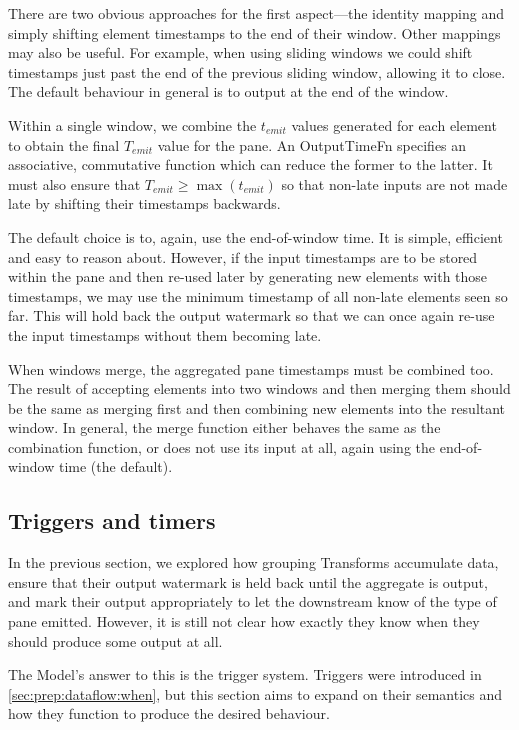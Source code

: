 There are two obvious approaches for the first aspect---the identity mapping and simply shifting element timestamps to the end of their window.
Other mappings may also be useful.
For example, when using sliding windows we could shift timestamps just past the end of the previous sliding window, allowing it to close.
The default behaviour in general is to output at the end of the window.

Within a single window, we combine the $t_{\mathit{emit}}$ values generated for each element to obtain the final $T_{\mathit{emit}}$ value for the pane.
An OutputTimeFn specifies an associative, commutative function which can reduce the former to the latter.
It must also ensure that $T_{\mathit{emit}} \geq \max(t_{\mathit{emit}})$ so that non-late inputs are not made late by shifting their timestamps backwards.

The default choice is to, again, use the end-of-window time.
It is simple, efficient and easy to reason about.
However, if the input timestamps are to be stored within the pane and then re-used later by generating new elements with those timestamps, we may use the minimum timestamp of all non-late elements seen so far.
This will hold back the output watermark so that we can once again re-use the input timestamps without them becoming late.

When windows merge, the aggregated pane timestamps must be combined too.
The result of accepting elements into two windows and then merging them should be the same as merging first and then combining new elements into the resultant window.
In general, the merge function either behaves the same as the combination function, or does not use its input at all, again using the end-of-window time (the default).

\subsection{Triggers and timers}

In the previous section, we explored how grouping Transforms accumulate data, ensure that their output watermark is held back until the aggregate is output, and mark their output appropriately to let the downstream know of the type of pane emitted.
However, it is still not clear how exactly they know when they should produce some output at all.

The Model's answer to this is the trigger system.
Triggers were introduced in \cref{sec:prep:dataflow:when}, but this section aims to expand on their semantics and how they function to produce the desired behaviour.

